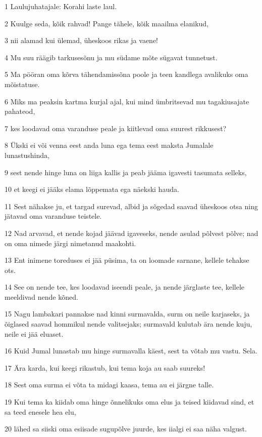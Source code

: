 \par 1 Laulujuhatajale: Korahi laste laul.
\par 2 Kuulge seda, kõik rahvad! Pange tähele, kõik maailma elanikud,
\par 3 nii alamad kui ülemad, üheskoos rikas ja vaene!
\par 4 Mu suu räägib tarkusesõnu ja mu südame mõte sügavat tunnetust.
\par 5 Ma pööran oma kõrva tähendamissõna poole ja teen kandlega avalikuks oma mõistatuse.
\par 6 Miks ma peaksin kartma kurjal ajal, kui mind ümbritsevad mu tagakiusajate pahateod,
\par 7 kes loodavad oma varanduse peale ja kiitlevad oma suurest rikkusest?
\par 8 Ükski ei või venna eest anda luna ega tema eest maksta Jumalale lunastushinda,
\par 9 sest nende hinge luna on liiga kallis ja peab jääma igavesti tasumata selleks,
\par 10 et keegi ei jääks elama lõppemata ega näekski hauda.
\par 11 Sest nähakse ju, et targad surevad, albid ja sõgedad saavad üheskoos otsa ning jätavad oma varanduse teistele.
\par 12 Nad arvavad, et nende kojad jäävad igaveseks, nende asulad põlvest põlve; nad on oma nimede järgi nimetanud maakohti.
\par 13 Ent inimene toreduses ei jää püsima, ta on loomade sarnane, kellele tehakse ots.
\par 14 See on nende tee, kes loodavad iseendi peale, ja nende järglaste tee, kellele meeldivad nende kõned.
\par 15 Nagu lambakari pannakse nad kinni surmavalda, surm on neile karjaseks, ja õiglased saavad hommikul nende valitsejaks; surmavald kulutab ära nende kuju, neile ei jää eluaset.
\par 16 Kuid Jumal lunastab mu hinge surmavalla käest, sest ta võtab mu vastu. Sela.
\par 17 Ära karda, kui keegi rikastub, kui tema koja au saab suureks!
\par 18 Sest oma surma ei võta ta midagi kaasa, tema au ei järgne talle.
\par 19 Kui tema ka kiidab oma hinge õnnelikuks oma elus ja teised kiidavad sind, et sa teed enesele hea elu,
\par 20 lähed sa siiski oma esiisade sugupõlve juurde, kes iialgi ei saa näha valgust.

